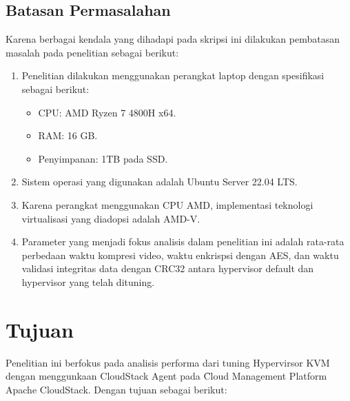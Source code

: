 \subsection{Batasan Permasalahan}
Karena berbagai kendala yang dihadapi pada skripsi ini dilakukan pembatasan masalah pada penelitian  sebagai berikut:
\begin{enumerate}
      \item Penelitian dilakukan menggunakan perangkat laptop dengan spesifikasi sebagai berikut:
            \begin{itemize}
                  \item CPU: AMD Ryzen 7 4800H x64.
                  \item RAM: 16 GB.
                  \item Penyimpanan: 1TB pada SSD.
            \end{itemize}
      \item Sistem operasi yang digunakan adalah Ubuntu Server 22.04 LTS.
      \item Karena perangkat menggunakan CPU AMD, implementasi teknologi virtualisasi yang diadopsi adalah AMD-V.
      \item Parameter yang menjadi fokus analisis dalam penelitian ini adalah rata-rata perbedaan waktu kompresi video, waktu enkrispsi dengan AES, dan waktu validasi integritas data dengan CRC32 antara hypervisor default dan hypervisor yang telah dituning.
\end{enumerate}


\section{Tujuan}
Penelitian ini berfokus pada analisis performa dari tuning Hypervirsor KVM dengan menggunkaan CloudStack Agent pada \f{Cloud Management Platform} Apache CloudStack. Dengan tujuan sebagai berikut:

